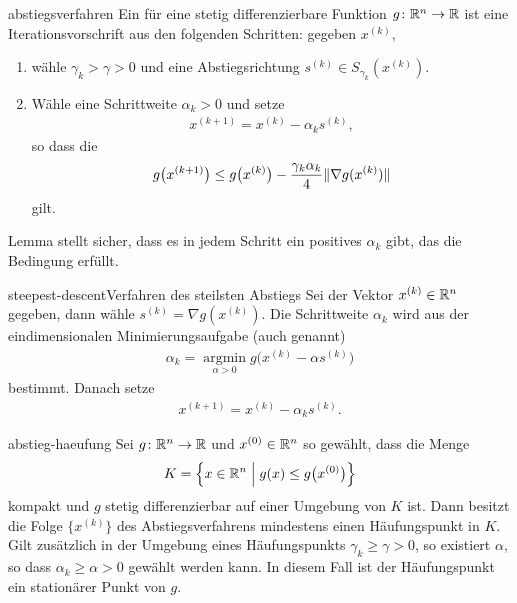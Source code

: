 \begin{Definition}{abstiegsverfahren}
  Ein  für eine stetig differenzierbare
  Funktion $g\colon \mathbb R^n\to\mathbb R$ ist eine Iterationsvorschrift aus den
  folgenden Schritten: gegeben $x^{(k)}$,
  \begin{enumerate}
  \item wähle $\gamma_k>\gamma>0$ und eine Abstiegsrichtung
    $s^{(k)} \in S_{\gamma_k}(x^{(k)})$.
  \item Wähle eine Schrittweite $\alpha_k>0$ und setze
    \begin{gather}
      x^{(k+1)} = x^{(k)} - \alpha_k s^{(k)},
    \end{gather}
    so dass die 
    \begin{gather}
      \label{eq:newton:7}
      g\bigl(x^{(k+1)}\bigr)
      \le g\bigl(x^{(k)}\bigr) - \frac{\gamma_k\alpha_k}{4}\lVert\nabla g(x^{(k)})\rVert
    \end{gather}
    gilt.
  \end{enumerate}
\end{Definition}

\begin{remark}
  Lemma  stellt sicher, dass es in
  jedem Schritt ein positives $\alpha_k$ gibt, das die Bedingung
  erfüllt.
\end{remark}

\begin{Beispiel*}{steepest-descent}{Verfahren des steilsten Abstiegs}
  Sei der Vektor $x^{(k)} \in\mathbb R^n$ gegeben, dann wähle
  $s^{(k)} = \nabla g(x^{(k)})$. Die Schrittweite $\alpha_k$ wird aus
  der eindimensionalen Minimierungsaufgabe (auch 
  genannt)
  \begin{gather}
    \alpha_k = \operatorname*{argmin}_{\alpha>0}
    g\bigl(x^{(k)} - \alpha s^{(k)}\bigr)
  \end{gather}
  bestimmt. Danach setze
  \begin{gather}
    x^{(k+1)} = x^{(k)} - \alpha_k s^{(k)}.
  \end{gather}
\end{Beispiel*}

\begin{Satz}{abstieg-haeufung}
  Sei $g\colon \mathbb R^n\to \mathbb R$ und $x^{(0)} \in\mathbb R^n$ so gewählt, dass die Menge
  \begin{gather}
    K = \Bigl\{x\in\mathbb R^n \; \Big| \; g(x) \le g\bigl(x^{(0)}\bigr) \Bigr\}
  \end{gather}
  kompakt und $g$ stetig differenzierbar auf einer Umgebung von $K$
  ist. Dann besitzt die Folge $\{x^{(k)}\}$ des Abstiegsverfahrens
  mindestens einen Häufungspunkt in $K$. Gilt zusätzlich in der
  Umgebung eines Häufungspunkts $\gamma_k \ge \gamma>0$, so existiert
  $\alpha$, so dass $\alpha_k \ge \alpha>0$ gewählt werden kann. In
  diesem Fall ist der Häufungspunkt ein stationärer Punkt von $g$.
\end{Satz}

